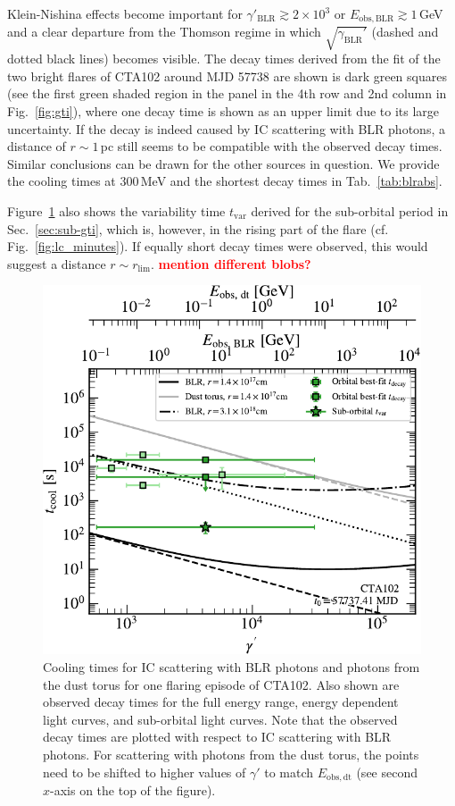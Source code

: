 \documentclass[twocolumn,linenumbers]{aastex62}
\newcommand{\todo}[1]{\textbf{\textcolor{red}{#1}}}
\begin{document}
Klein-Nishina effects become important for $\gamma'_\mathrm{BLR} \gtrsim 2\times10^3$ or $E_\mathrm{obs,BLR}\gtrsim1\,$GeV and a clear departure from the Thomson regime in which 
$\sqrt{\gamma_\mathrm{BLR}'}$ (dashed and dotted black lines) becomes visible.
The decay times derived from the fit of the two bright flares of CTA102 around MJD 57738 are shown is dark green squares (see the first green shaded region in the panel in the 4th row and 2nd column in Fig.~\ref{fig:gti}), where one decay time is shown as an upper limit due to its large uncertainty. 
If the decay is indeed caused by IC scattering with BLR photons, a distance of $r\sim1\,$pc still seems to be compatible with the observed decay times. 
Similar conclusions can be drawn for the other sources in question. 
We provide the cooling times at 300\,MeV and the shortest decay times in Tab.~\ref{tab:blrabs}.

Figure~\ref{fig:tcool} also shows the variability time $t_\mathrm{var}$ derived for the sub-orbital period in Sec.~\ref{sec:sub-gti}, which is, however, in the rising part of the flare (cf. Fig.~\ref{fig:lc_minutes}). If equally short decay times were observed, this would suggest a distance $r \sim r_\mathrm{lim}$. \todo{mention different blobs?}

\begin{figure}
    \centering
    \includegraphics[width = .9\linewidth]{figures/tcool_CTA102_t001_LogParabola_ring.pdf}
    \caption{Cooling times for IC scattering with BLR photons and photons from the dust torus for one flaring episode of CTA102. Also shown are observed decay times for the full energy range, energy dependent light curves, and sub-orbital light curves.
    Note that the observed decay times are plotted with respect to IC scattering with BLR photons. For scattering with photons from the dust torus, the points need to be shifted to higher values of $\gamma'$ to match $E_\mathrm{obs,dt}$ (see second $x$-axis on the top of the figure).}
    \label{fig:tcool}
\end{figure}
\end{document}
